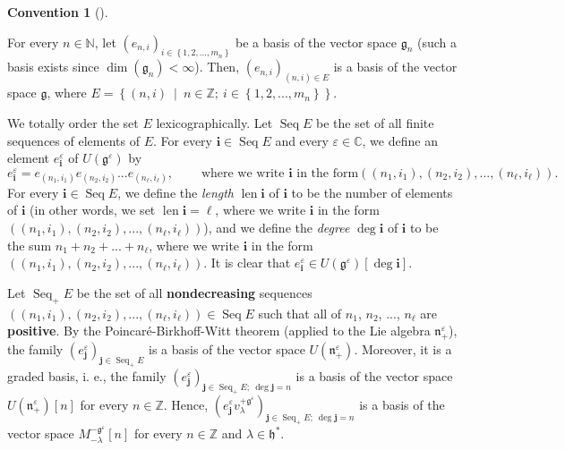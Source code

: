 \documentclass
[numbers=enddot,12pt,final,onecolumn,german,notitlepage]{scrartcl}%
\theoremstyle{definition}
\newtheorem{conv}[theo]{Convention}
\newenvironment{Convention}[1][]
{\begin{conv}[#1]\begin{leftbar}}
{\end{leftbar}\end{conv}}
\begin{document}
\begin{Convention}
For every $n\in\mathbb{N}$, let $\left(  e_{n,i}\right)  _{i\in\left\{
1,2,...,m_{n}\right\}  }$ be a basis of the vector space $\mathfrak{g}_{n}$
(such a basis exists since $\dim\left(  \mathfrak{g}_{n}\right)  <\infty$).
Then, $\left(  e_{n,i}\right)  _{\left(  n,i\right)  \in E}$ is a basis of the
vector space $\mathfrak{g}$, where $E=\left\{  \left(  n,i\right)
\ \mid\ n\in\mathbb{Z};\ i\in\left\{  1,2,...,m_{n}\right\}  \right\}  $.

We totally order the set $E$ lexicographically. Let $\operatorname*{Seq}E$ be
the set of all finite sequences of elements of $E$. For every $\mathbf{i}%
\in\operatorname*{Seq}E$ and every $\varepsilon\in\mathbb{C}$, we define an
element $e_{\mathbf{i}}^{\varepsilon}$ of $U\left(  \mathfrak{g}^{\varepsilon
}\right)  $ by%
\[
e_{\mathbf{i}}^{\varepsilon}=e_{\left(  n_{1},i_{1}\right)  }e_{\left(
n_{2},i_{2}\right)  }...e_{\left(  n_{\ell},i_{\ell}\right)  }%
,\ \ \ \ \ \ \ \ \ \ \text{where we write }\mathbf{i}\text{ in the form
}\left(  \left(  n_{1},i_{1}\right)  ,\left(  n_{2},i_{2}\right)  ,...,\left(
n_{\ell},i_{\ell}\right)  \right)  .
\]
For every $\mathbf{i}\in\operatorname*{Seq}E$, we define the \textit{length}
$\operatorname*{len}\mathbf{i}$ of $\mathbf{i}$ to be the number of elements
of $\mathbf{i}$ (in other words, we set $\operatorname*{len}\mathbf{i}=\ell$,
where we write $\mathbf{i}$ in the form $\left(  \left(  n_{1},i_{1}\right)
,\left(  n_{2},i_{2}\right)  ,...,\left(  n_{\ell},i_{\ell}\right)  \right)
$), and we define the \textit{degree} $\deg\mathbf{i}$ of $\mathbf{i}$ to be
the sum $n_{1}+n_{2}+...+n_{\ell}$, where we write $\mathbf{i}$ in the form
$\left(  \left(  n_{1},i_{1}\right)  ,\left(  n_{2},i_{2}\right)  ,...,\left(
n_{\ell},i_{\ell}\right)  \right)  $. It is clear that $e_{\mathbf{i}%
}^{\varepsilon}\in U\left(  \mathfrak{g}^{\varepsilon}\right)  \left[
\deg\mathbf{i}\right]  $.

Let $\operatorname*{Seq}\nolimits_{+}E$ be the set of all
\textbf{nondecreasing} sequences $\left(  \left(  n_{1},i_{1}\right)  ,\left(
n_{2},i_{2}\right)  ,...,\left(  n_{\ell},i_{\ell}\right)  \right)
\in\operatorname*{Seq}E$ such that all of $n_{1}$, $n_{2}$, $...$, $n_{\ell}$
are \textbf{positive}. By the Poincar\'{e}-Birkhoff-Witt theorem (applied to
the Lie algebra $\mathfrak{n}_{+}^{\varepsilon}$), the family $\left(
e_{\mathbf{j}}^{\varepsilon}\right)  _{\mathbf{j}\in\operatorname*{Seq}%
\nolimits_{+}E}$ is a basis of the vector space $U\left(  \mathfrak{n}%
_{+}^{\varepsilon}\right)  $. Moreover, it is a graded basis, i. e., the
family $\left(  e_{\mathbf{j}}^{\varepsilon}\right)  _{\mathbf{j}%
\in\operatorname*{Seq}\nolimits_{+}E;\ \deg\mathbf{j}=n}$ is a basis of the
vector space $U\left(  \mathfrak{n}_{+}^{\varepsilon}\right)  \left[
n\right]  $ for every $n\in\mathbb{Z}$. Hence, $\left(  e_{\mathbf{j}%
}^{\varepsilon}v_{\lambda}^{+\mathfrak{g}^{\varepsilon}}\right)
_{\mathbf{j}\in\operatorname*{Seq}\nolimits_{+}E;\ \deg\mathbf{j}=n}$ is a
basis of the vector space $M_{-\lambda}^{-\mathfrak{g}^{\varepsilon}}\left[
n\right]  $ for every $n\in\mathbb{Z}$ and $\lambda\in\mathfrak{h}^{\ast}$.


\end{Convention}
\end{document}
